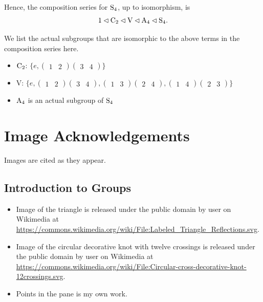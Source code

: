 \begin{enumerate}
    Hence, the composition series for $\mathrm{S}_{4}$, up to isomorphism, is
    \[
        1 \lhd \mathrm{C}_{2} \lhd \mathrm{V} \lhd \mathrm{A}_{4} \lhd \mathrm{S}_{4}.   
    \]
    \begin{remark}
        We list the actual subgroups that are isomorphic to the above terms in the composition series here.
        \begin{itemize}
            \item $\mathrm{C}_{2}$: $\{e, \begin{pmatrix}1&2\end{pmatrix}\begin{pmatrix}3&4\end{pmatrix}\}$
            \item V: $\{e, \begin{pmatrix}1&2\end{pmatrix}\begin{pmatrix}3&4\end{pmatrix}, \begin{pmatrix}1&3\end{pmatrix}\begin{pmatrix}2&4\end{pmatrix}, \begin{pmatrix}1&4\end{pmatrix}\begin{pmatrix}2&3\end{pmatrix}\}$
            \item $\mathrm{A}_{4}$ is an actual subgroup of $\mathrm{S}_{4}$
        \end{itemize}
    \end{remark}
\end{enumerate}

\chapter{Image Acknowledgements}
Images are cited as they appear.

\section{Introduction to Groups}
\begin{itemize}
    \item Image of the triangle is released under the public domain by user  on Wikimedia at \url{https://commons.wikimedia.org/wiki/File:Labeled_Triangle_Reflections.svg}.
    \item Image of the circular decorative knot with twelve crossings is released under the public domain by user  on Wikimedia at \url{https://commons.wikimedia.org/wiki/File:Circular-cross-decorative-knot-12crossings.svg}.
    \item Points in the pane is my own work.
\end{itemize}

